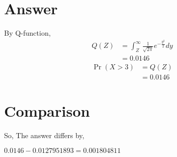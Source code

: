 \documentclass[journal,12pt,twocolumn]{IEEEtran}
\providecommand{\pr}[1]{\ensuremath{\Pr\left(#1\right)}}
\theoremstyle{remark}
\begin{document}
\section{Answer}
By Q-function,
\begin{align}
Q(Z) &= \int_Z^{\infty} \frac{1}{\sqrt{2\pi}}e^{-\frac{y^2}{2}}dy\\
     &= 0.0146
\end{align}
\begin{align}
\pr{X > 3} &= Q(Z)\\
	  &= 0.0146
\end{align}

\section{Comparison }
So, The answer differs by,

\(0.0146 - 0.0127951893 = 0.001804811\)
\end{document}
